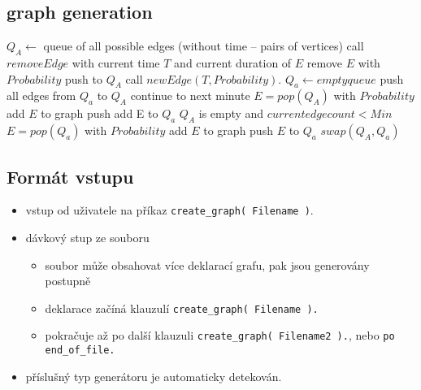\documentclass[11pt, a4paper,draft]{article}
\newcommand{\pl}[1]{\texttt{#1}} %
\theoremstyle{plain}
\theoremstyle{definition}
\theoremstyle{remark}
\begin{document}
\subsection{graph generation}
\begin{algorithmic}[1]
    \State $Q_A \leftarrow$ queue of all possible edges (without time -- pairs of vertices)
            \State call $removeEdge$ with current time $T$ and current duration of $E$
            \State remove $E$ with $Probability$
             push to $Q_A$ \EndIf
        \EndFor
        \State call $newEdge( T, Probability )$.
        \State $Q_a \leftarrow empty queue$
                \State push all edges from $Q_a$ to $Q_A$
                \State continue to next minute
            \EndIf
            \State $E = pop( Q_A )$
            \State with $Probability$ add $E$ to graph
             push add E to $Q_a$ \EndIf
            \If $Q_A$ is empty and $current edge count < Min$
                    \State $E = pop( Q_a )$
                    \State with $Probability$ add $E$ to graph
                     push $E$ to $Q_a$ \EndIf
                \EndWhile
            \EndIf
        \EndWhile
        \State $swap( Q_A, Q_a )$ 
    \EndFor
\end{algorithmic}

\subsection{Formát vstupu}
\begin{itemize}
    \item vstup od uživatele na příkaz \pl{create\_graph( Filename )}.
    \item dávkový stup ze souboru
        \begin{itemize}
            \item soubor může obsahovat více deklarací grafu, pak jsou generovány postupně
            \item deklarace začíná klauzulí \pl{create\_graph( Filename ).}
            \item pokračuje až po další klauzuli \pl{create\_graph( Filename2 ).}, nebo
                \pl{po end\_of\_file.}
        \end{itemize}
    \item příslušný typ generátoru je automaticky detekován.
\end{itemize}
\end{document}
